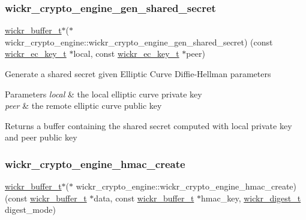 \subsubsection{\texorpdfstring{wickr\_crypto\_engine\_gen\_shared\_secret}{wickr\_crypto\_engine\_gen\_shared\_secret}}
{\footnotesize\ttfamily \mbox{\hyperlink{structwickr__buffer}{wickr\+\_\+buffer\+\_\+t}}$\ast$($\ast$ wickr\+\_\+crypto\+\_\+engine\+::wickr\+\_\+crypto\+\_\+engine\+\_\+gen\+\_\+shared\+\_\+secret) (const \mbox{\hyperlink{structwickr__ec__key}{wickr\+\_\+ec\+\_\+key\+\_\+t}} $\ast$local, const \mbox{\hyperlink{structwickr__ec__key}{wickr\+\_\+ec\+\_\+key\+\_\+t}} $\ast$peer)}

Generate a shared secret given Elliptic Curve Diffie-\/\+Hellman parameters


\begin{DoxyParams}{Parameters}
{\em local} & the local elliptic curve private key \\
\hline
{\em peer} & the remote elliptic curve public key \\
\hline
\end{DoxyParams}
\begin{DoxyReturn}{Returns}
a buffer containing the shared secret computed with \textquotesingle{}local\textquotesingle{} private key and \textquotesingle{}peer\textquotesingle{} public key 
\end{DoxyReturn}
\mbox{\label{group__wickr__crypto__engine_ga782e0e8786ecf8a55c8ae2aea2f178aa}} 
\subsubsection{\texorpdfstring{wickr\_crypto\_engine\_hmac\_create}{wickr\_crypto\_engine\_hmac\_create}}
{\footnotesize\ttfamily \mbox{\hyperlink{structwickr__buffer}{wickr\+\_\+buffer\+\_\+t}}$\ast$($\ast$ wickr\+\_\+crypto\+\_\+engine\+::wickr\+\_\+crypto\+\_\+engine\+\_\+hmac\+\_\+create) (const \mbox{\hyperlink{structwickr__buffer}{wickr\+\_\+buffer\+\_\+t}} $\ast$data, const \mbox{\hyperlink{structwickr__buffer}{wickr\+\_\+buffer\+\_\+t}} $\ast$hmac\+\_\+key, \mbox{\hyperlink{structwickr__digest}{wickr\+\_\+digest\+\_\+t}} digest\+\_\+mode)}

